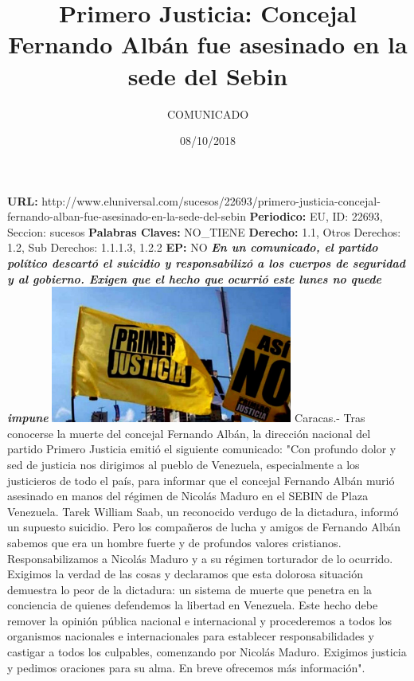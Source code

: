 \documentclass{article}%
\title{\textbf{Primero Justicia: Concejal Fernando Albán fue asesinado en la sede del Sebin}}%
\author{COMUNICADO}%
\date{08/10/2018}%
\begin{document}
%
\normalsize%
\maketitle%
\textbf{URL: }%
http://www.eluniversal.com/sucesos/22693/primero{-}justicia{-}concejal{-}fernando{-}alban{-}fue{-}asesinado{-}en{-}la{-}sede{-}del{-}sebin\newline%
%
\textbf{Periodico: }%
EU, %
ID: %
22693, %
Seccion: %
sucesos\newline%
%
\textbf{Palabras Claves: }%
NO\_TIENE\newline%
%
\textbf{Derecho: }%
1.1, %
Otros Derechos: %
1.2, %
Sub Derechos: %
1.1.1.3, 1.2.2\newline%
%
\textbf{EP: }%
NO\newline%
\newline%
%
\textbf{\textit{En un comunicado, el partido político descartó  el suicidio y responsabilizó a los cuerpos de seguridad y al gobierno. Exigen que el hecho que ocurrió este lunes no quede impune}}%
\newline%
\newline%
%
\includegraphics[width=300px]{149.jpg}%
\newline%
%
Caracas.{-} Tras conocerse la muerte del concejal Fernando Albán, la dirección nacional del partido Primero Justicia emitió el siguiente comunicado:%
\newline%
%
"Con profundo dolor y sed de justicia nos dirigimos al pueblo de Venezuela, especialmente a los justicieros de todo el país, para informar que el concejal Fernando Albán murió asesinado en manos del régimen de Nicolás Maduro en el SEBIN de Plaza Venezuela. Tarek William Saab, un reconocido verdugo de la dictadura, informó un supuesto suicidio. Pero los compañeros de lucha y amigos de Fernando Albán sabemos que era un hombre fuerte y de profundos valores cristianos. Responsabilizamos a Nicolás Maduro y a su régimen torturador de lo ocurrido. Exigimos la verdad de las cosas y declaramos que esta dolorosa situación demuestra lo peor de la dictadura: un sistema de muerte que penetra en la conciencia de quienes defendemos la libertad en Venezuela. Este hecho debe remover la opinión pública nacional e internacional y procederemos a todos los organismos nacionales e internacionales para establecer responsabilidades y castigar a todos los culpables, comenzando por Nicolás Maduro.\newline%
\newline%
Exigimos justicia y pedimos oraciones para su alma. En breve ofrecemos más información".%
\newline%
%
\end{document}
